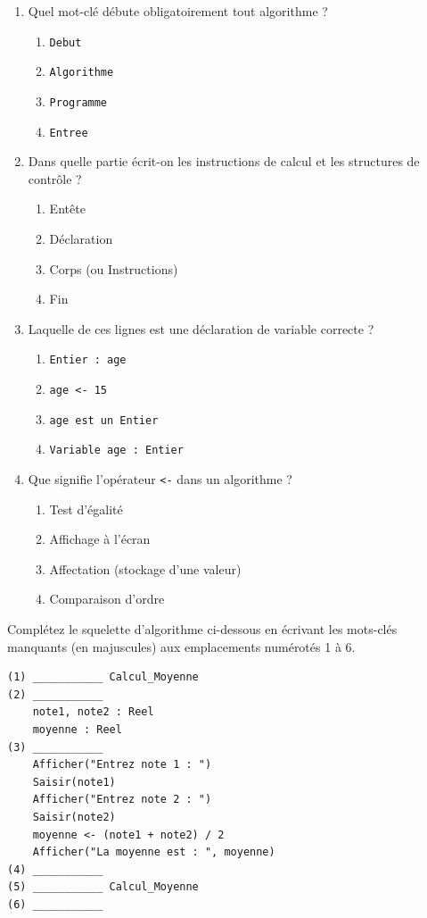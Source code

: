 \documentclass[11pt]{article}
\begin{document}
\begin{exercice}
\begin{enumerate}
    \item Quel mot-clé débute obligatoirement tout algorithme ?
    \begin{enumerate}
        \item \texttt{Debut}
        \item \texttt{Algorithme}
        \item \texttt{Programme}
        \item \texttt{Entree}
    \end{enumerate}
    \item Dans quelle partie écrit-on les instructions de calcul et les structures de contrôle ?
    \begin{enumerate}
        \item Entête
        \item Déclaration
        \item Corps (ou Instructions)
        \item Fin
    \end{enumerate}
    \item Laquelle de ces lignes est une déclaration de variable correcte ?
    \begin{enumerate}
        \item \texttt{Entier : age}
        \item \texttt{age <- 15}
        \item \texttt{age est un Entier}
        \item \texttt{Variable age : Entier}
    \end{enumerate}
    \item Que signifie l'opérateur \texttt{<-} dans un algorithme ?
    \begin{enumerate}
        \item Test d'égalité
        \item Affichage à l'écran
        \item Affectation (stockage d'une valeur)
        \item Comparaison d'ordre
    \end{enumerate}
\end{enumerate}
\end{exercice}

\begin{exercice}
Complétez le squelette d'algorithme ci-dessous en écrivant les mots-clés manquants (en majuscules) aux emplacements numérotés 1 à 6.

\begin{verbatim}
(1) ___________ Calcul_Moyenne
(2) ___________
    note1, note2 : Reel
    moyenne : Reel
(3) ___________
    Afficher("Entrez note 1 : ")
    Saisir(note1)
    Afficher("Entrez note 2 : ")
    Saisir(note2)
    moyenne <- (note1 + note2) / 2
    Afficher("La moyenne est : ", moyenne)
(4) ___________
(5) ___________ Calcul_Moyenne
(6) ___________
\end{verbatim}
\end{exercice}
\end{document}
